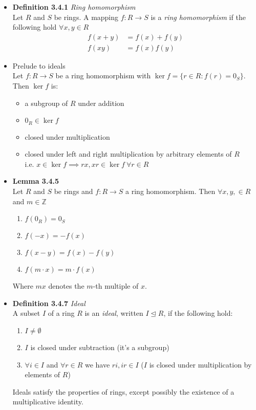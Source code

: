 \documentclass[11pt,a4paper]{article}
\begin{document}
\begin{itemize}

    \item \textbf{Definition 3.4.1} \emph{Ring homomorphism} \\
        Let $R$ and $S$ be rings.
        A mapping $f : R \to S$ is a \emph{ring homomorphism} if the following hold
        $\forall x,y\in R$
        \begin{align*}{}
            f(x+y) & = f(x) + f(y) \\
            f(xy)  & = f(x)f(y)
        \end{align*}

    \item Prelude to ideals \\
        Let $f : R \to S$ be a ring homomorphism with $\ker f = \{ r \in R : f(r) = 0_S \}$.
        Then $\ker f$ is:
        \begin{itemize}
            \item a subgroup of $R$ under addition
            \item $0_R \in \ker f$
            \item closed under multiplication
            \item closed under left and right multiplication by arbitrary elements of $R$ \\
                i.e. $x \in \ker f \implies rx, xr \in \ker f \ \forall r \in R$
        \end{itemize}

    \item \textbf{Lemma 3.4.5} \\
        Let $R$ and $S$ be rings and $f : R \to S$ a ring homomorphism.
        Then $\forall x,y, \in R$ and $m \in \mathbb{Z}$
        \begin{enumerate}
            \item $f(0_R)       = 0_S$
            \item $f(-x)        = -f(x)$
            \item $f(x-y)       = f(x) - f(y)$
            \item $f(m \cdot x) = m\cdot f(x)$
        \end{enumerate}
        Where $mx$ denotes the $m$-th multiple of $x$.

    \item \textbf{Definition 3.4.7} \emph{Ideal} \\
        A subset $I$ of a ring $R$ is an \emph{ideal}, written $I \trianglelefteq R$,
        if the following hold:
        \begin{enumerate}
            \item $I \neq \emptyset$
            \item $I$ is closed under subtraction (it's a subgroup)
            \item $\forall i \in I$ and $\forall r \in R$ we have $ri, ir \in I$
                ($I$ is closed under multiplication by elements of $R$)
        \end{enumerate}
        Ideals satisfy the properties of rings, except possibly the existence of a multiplicative
        identity.


\end{itemize}
\end{document}
